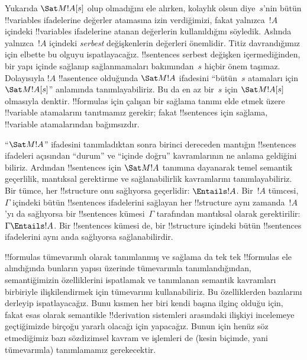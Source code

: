 \documentclass[../../../include/open-logic-section]{subfiles}
\begin{document}


Yukarıda $\Sat M{!A}[s]$ olup olmadığını ele alırken, kolaylık olsun
diye~$s$'nin bütün !!{variable}s ifadelerine değerler atamasına izin
verdiğimizi, fakat yalnızca~$!A$ içindeki !!{variable}s ifadelerine
atanan değerlerin kullanıldığını söyledik. Aslında yalnızca~$!A$
içindeki \emph{serbest} değişkenlerin değerleri önemlidir. Titiz
davrandığımız için elbette bu olguyu ispatlayacağız. !!{sentence}s
serbest değişken içermediğinden, bir yapı içinde sağlanıp
sağlanmamaları bakımından~$s$ hiçbir önem taşımaz. Dolayısıyla $!A$
!!a{sentence} olduğunda $\Sat M{!A}$ ifadesini ``bütün~$s$ atamaları
için $\Sat M{!A}[s]$'' anlamında tanımlayabiliriz. Bu da en az bir~$s$
için $\Sat M{!A}[s]$ olmasıyla denktir. !!{formula}s için çalışan bir
sağlama tanımı elde etmek üzere !!{variable} atamalarını tanıtmamız
gerekir; fakat !!{sentence}s için sağlama, !!{variable} atamalarından
bağımsızdır.

``$\Sat M{!A}$'' ifadesini tanımladıktan sonra birinci dereceden
mantığın !!{sentence}s ifadeleri açısından ``durum'' ve ``içinde
doğru'' kavramlarının ne anlama geldiğini biliriz. Ardından
!!{sentence}s için $\Sat M{!A}$ tanımına dayanarak temel semantik
geçerlilik, mantıksal gerektirme ve sağlanabilirlik kavramlarını
tanımlayabiliriz. Bir tümce, her !!{structure} onu sağlıyorsa geçerlidir:
$\Entails !A$. Bir~$!A$ tümcesi,~$\Gamma$ içindeki bütün !!{sentence}s
ifadelerini sağlayan her !!{structure} aynı zamanda~$!A$'yı da
sağlıyorsa bir !!{sentence}s kümesi~$\Gamma$ tarafından mantıksal
olarak gerektirilir: $\Gamma\Entails !A$. Bir !!{sentence}s kümesi de,
bir !!{structure} içindeki bütün !!{sentence}s ifadelerini aynı anda
sağlıyorsa sağlanabilirdir.

!!{formula}s tümevarımlı olarak tanımlanmış ve sağlama da tek tek
!!{formula}s ele alındığında bunların yapısı üzerinde tümevarımla
tanımlandığından, semantiğimizin
özelliklerini ispatlamak ve tanımlanan semantik kavramları birbiriyle
ilişkilendirmek için tümevarımı kullanabiliriz. Bu özelliklerden
bazılarını derleyip ispatlayacağız. Bunu kısmen her biri kendi başına
ilginç olduğu için, fakat esas olarak semantikle !!{derivation}
sistemleri arasındaki ilişkiyi incelemeye geçtiğimizde birçoğu yararlı
olacağı için yapacağız. Bunun için henüz söz etmediğimiz bazı sözdizimsel
kavram ve işlemleri de (kesin biçimde, yani tümevarımla) tanımlamamız
gerekecektir.
\end{document}
